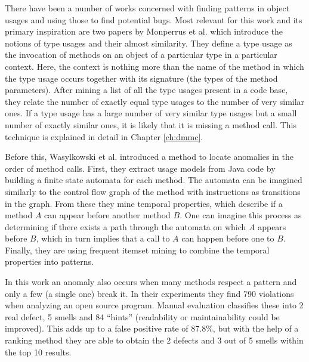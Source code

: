 There have been a number of works concerned with finding patterns in object usages and using those to find potential bugs.
Most relevant for this work and its primary inspiration are two papers by Monperrus et al.\cite{monperrus2010detecting}\cite{monperrus2013detecting} which introduce the notions of type usages and their almost similarity.
They define a type usage as the invocation of methods on an object of a particular type in a particular context.
Here, the context is nothing more than the name of the method in which the type usage occurs together with its signature (the types of the method parameters).
After mining a list of all the type usages present in a code base, they relate the number of exactly equal type usages to the number of very similar ones.
If a type usage has a large number of very similar type usages but a small number of exactly similar ones, it is likely that it is missing a method call.
This technique is explained in detail in Chapter \ref{ch:dmmc}.


Before this, Wasylkowski et al. \cite{wasylkowski2007detecting} introduced a method to locate anomalies in the order of method calls.
First, they extract usage models from Java code by building a finite state automata for each method.
The automata can be imagined similarly to the control flow graph of the method with instructions as transitions in the graph.
From these they mine temporal properties, which describe if a method $A$ can appear before another method $B$.
One can imagine this process as determining if there exists a path through the automata on which $A$ appears before $B$, which in turn implies that a call to $A$ can happen before one to $B$.
Finally, they are using frequent itemset mining \cite{han2006data} to combine the temporal properties into patterns.

In this work an anomaly also occurs when many methods respect a pattern and only a few (a single one) break it.
In their experiments they find 790 violations when analyzing an open source program.
Manual evaluation classifies these into 2 real defect, 5 smells and 84 ``hints'' (readability or maintainability could be improved).
This adds up to a false positive rate of 87.8\%, but with the help of a ranking method they are able to obtain the 2 defects and 3 out of 5 smells within the top 10 results.

